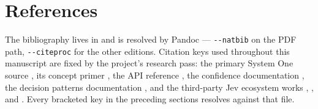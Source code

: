 \documentclass[
  english,
]{article}
\begin{document}
\newpage

\section{References}\label{sec:references}

The bibliography lives in
\href{references.bib}{} and is
resolved by Pandoc --- \texttt{-\/-natbib} on the PDF path,
\texttt{-\/-citeproc} for the other editions. Citation keys used
throughout this manuscript are fixed by the project's research pass: the
primary System One source \citep{typesafe2026systemone}, its concept
primer \citep{typesafe2026systemoneconcept}, the API reference
\citep{typesafe2026apidocs}, the confidence documentation
\citep{typesafe2026confidence}, the decision patterns documentation
\citep{typesafe2026patterns}, and the third-party Jev ecosystem works
\citep{register2026jev}, \citep{orcarouter2026jev}, and
\citep{elsolitario2026jev}. Every bracketed key in the preceding
sections resolves against that file.



\providecommand{\bibsection}{}
\renewcommand{\bibsection}{}


\end{document}
